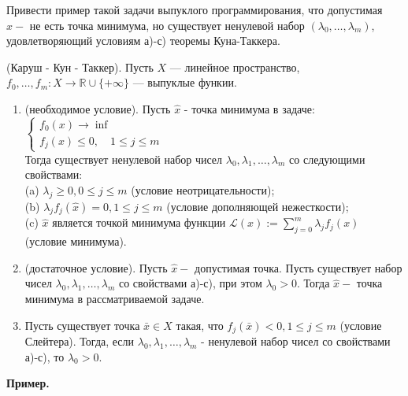 \begin{task}
Привести пример такой задачи выпуклого программирования, что допустимая $\hat{x}-$ не есть точка минимума, но существует ненулевой набор $\left(\lambda_{0}, \ldots, \lambda_{m}\right)$, удовлетворяющий условиям а)-с) теоремы Куна-Таккера.

\begin{theorem}
    (Каруш - Кун - Таккер). Пусть $X$ --- линейное пространство, $f_0, \ldots, f_m: X \rightarrow \mathbb{R} \cup\{+\infty\}$ --- выпуклые функии.
    \begin{enumerate}
        \item (необходимое условие). Пусть $\hat{x}$ - точка минимума в задаче: 
                \\
                $\left\{\begin{array}{l}f_0(x) \rightarrow \inf \\ f_j(x) \leq 0, \quad 1 \leq j \leq m\end{array}\right.$
                \\

        Тогда существует ненулевой набор чисел $\lambda_0, \lambda_1, \ldots, \lambda_m$ со следующими свойствами: \\
            (a) $\lambda_j \geq 0,0 \leq j \leq m$ (условие неотрицательности); \\
            (b) $\lambda_j f_j(\hat{x})=0, 1 \leq j \leq m$ (условие дополняющей нежесткости); \\
            (c) $\hat{x}$ является точкой минимума функции $\mathcal{L}(x):=\sum_{j=0}^m \lambda_j f_j(x)$ (условие минимума). \\
        \item (достаточное условие). Пусть $\hat{x}-$ допустимая точка. Пусть существует набор чисел $\lambda_0, \lambda_1, \ldots, \lambda_m$ 
            со свойствами а)-с), при этом $\lambda_0>0$. Тогда $\hat{x}-$ точка минимума в рассматриваемой задаче.
        \item Пусть существует точка $\bar{x} \in X$ такая, что $f_j(\bar{x})<0,1 \leq j \leq m$ (условие Слейтера). 
        Тогда, если $\lambda_0, \lambda_1, \ldots, \lambda_m$ - ненулевой набор чисел со свойствами а)-с), то $\lambda_0>0$.
    \end{enumerate}
\end{theorem}

\textbf{Пример.}


\end{task}
